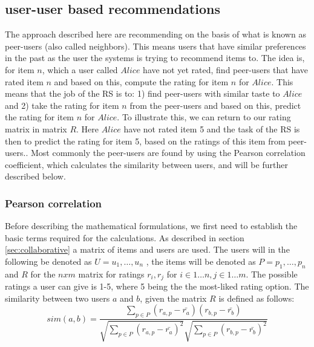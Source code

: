 \subsection{user-user based recommendations} %
\label{sub:user_user_based_recommendations}
The approach described here are recommending on the basis of what is known as peer-users (also called neighbors). This means users that have similar preferences in the past as the user the systems is trying to recommend items to. The idea is, for item \(n\), which a user called \(Alice\) have not yet rated, find peer-users that have rated item \(n\) and based on this, compute the rating for item \(n\) for \(Alice\). This means that the job of the RS is to: 1) find peer-users with similar taste to \(Alice\) and 2) take the rating for item \(n\) from the peer-users and based on this, predict the rating for item \(n\) for \(Alice\).\newline
To illustrate this, we can return to our rating matrix in matrix \(R\). Here \(Alice\) have not rated item 5 and the task of the RS is then to predict the rating for item 5, based on the ratings of this item from peer-users.. Most commonly the peer-users are found by using the Pearson correlation coefficient\citep{IntroductionRecommenderSystems}, which calculates the similarity between users, and will be further described below.

\subsubsection{Pearson correlation}
Before describing the mathematical formulations, we first need to establish the basic terms required for the calculations. As described in section \ref{sec:collaborative} a matrix of items and users are used. The users will in the following be denoted as \( U = {u_{1}, \ldots , u_{n}} \) , the items will be denoted as \( P = {p_{1}, \ldots , p_{n}} \) and \(R\) for the \({n x m}\) matrix for ratings \(r_{i}, r_{j}\) for \(i \in 1 \ldots n, j \in 1 \ldots m\). The possible ratings a user can give is 1-5, where 5 being the the most-liked rating option. 
The similarity between two users \(a\) and \(b\), given the matrix \(R\) is defined as follows:\\

\[
	sim(a,b) = \frac{\sum_{p\in P} (r_{a,p} - \bar{r_{a}})(r_{b,p} - \bar{r_{b}})}{\sqrt{\sum_{p\in P} (r_{a,p} - \bar{r_{a}})^2} \sqrt{\sum_{p\in P} (r_{b,p} - \bar{r_{b}})^2}}
\]


